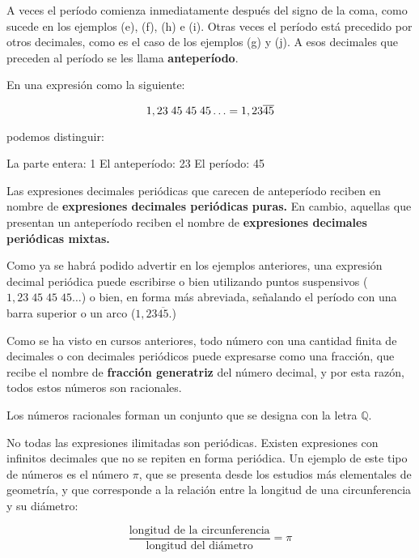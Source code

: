 A veces el período comienza inmediatamente después del signo de la coma, 
como sucede en los ejemplos (e), (f), (h) e (i). Otras veces el período está 
precedido por otros decimales, como es el caso de los ejemplos (g) y (j). 
A esos decimales que preceden al período se les llama  \textbf{anteperíodo}. 

En una expresión como la siguiente:

{\setlength{\abovedisplayskip}{0ex}
 \[
 1,23\;45\;45\;45\ldots = 1,23\overline{45}
 \]

podemos distinguir:

\begin{ejemplos}[1][\textbullet]
  \task La parte entera: 1
  \task El anteperíodo: 23
  \task El período: 45
\end{ejemplos}


Las expresiones decimales periódicas que carecen de anteperíodo reciben en nombre de \textbf{expresiones
decimales periódicas puras.}  En cambio, aquellas que presentan un anteperíodo reciben el nombre 
de \textbf{expresiones decimales periódicas mixtas.}

Como ya se habrá podido advertir en los ejemplos anteriores, una expresión decimal periódica puede
escribirse o bien utilizando puntos suspensivos ($1,23\;45\;45\;45\ldots$) o bien, en forma más abreviada,
señalando el período con una barra superior o un arco ($1,23\overline{45}$.)

Como se ha visto en cursos anteriores, todo número con una cantidad finita de decimales o con decimales
periódicos puede expresarse como una fracción, que recibe el nombre de \textbf{fracción generatriz} del 
número decimal, y por esta razón, todos estos números son racionales.
 
\begin{center}
Los números racionales forman un conjunto que se designa con la letra $\mathbb{Q}$.
\end{center}


No todas las expresiones ilimitadas son periódicas. Existen expresiones
con infinitos decimales que no se repiten en forma periódica. Un ejemplo de este tipo de números 
es el número $\pi$, que se presenta desde los estudios más elementales de geometría, y
que corresponde a la relación entre la longitud de una circunferencia y su
diámetro:

\vspace{-1.25ex}
\begin{equation*}
  \dfrac{\text{longitud de la circunferencia}}{\text{longitud del diámetro}} = \pi
\end{equation*}
\vspace{-1ex}

}
